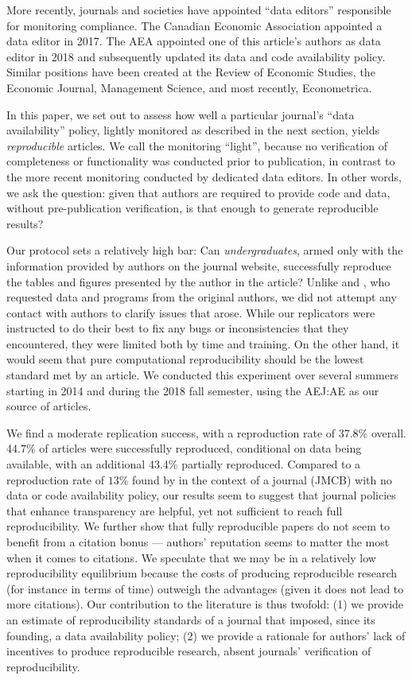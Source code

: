 \documentclass{cje} %
\theoremstyle{plain}%
\theoremstyle{definition}
\theoremstyle{remark}
\begin{document}
More recently, journals and societies have appointed ``data editors'' responsible for monitoring compliance. The Canadian Economic Association appointed a data editor  in 2017. The \ac{AEA} appointed one of this article's authors as data editor in 2018  \citep{10.1257/pandp.108.745} and subsequently updated its data and code availability policy. Similar positions have been created at the Review of Economic Studies, the Economic Journal, Management Science, and most recently, Econometrica. 

In this paper,  we set out to assess how well a particular journal's ``data availability'' policy, lightly monitored as described in the next section, yields \textit{reproducible} articles. We call the monitoring ``light'', because no verification of completeness or functionality was conducted prior to publication, in contrast to the more recent monitoring conducted by dedicated data editors. In other words, we ask the question: given that authors are required to provide code and data, without pre-publication verification, is that enough to generate reproducible results?

Our protocol sets a relatively high bar: Can \textit{undergraduates}, armed only with the information provided by authors on the journal website, successfully reproduce the tables and figures presented by the author in the article? Unlike \cite{Dewald1986} and \cite{McCullough03}, who requested data and programs from the original authors, we did not attempt any contact with authors to clarify issues that arose. While our replicators were instructed to do their best to fix any bugs or inconsistencies that they encountered, they were limited both by time and training. On the other hand, it would seem that pure computational reproducibility should be the lowest standard met by an article.
We conducted this experiment over several summers starting in 2014 and during the 2018 fall semester, using the \ac{AEJ:AE} as our source of articles.

We find a  moderate replication success, with a reproduction rate of 37.8$\%$ overall. 44.7$\%$ of articles were successfully reproduced, conditional on  data being available, with an additional 43.4$\%$ partially reproduced. Compared  to a reproduction rate of $13\%$ found by \cite{Dewald1986} in the context of a journal (\ac{JMCB}) with no data or code availability policy, our results seem to suggest that journal policies that enhance transparency are helpful, yet not sufficient to reach full reproducibility. We further show that fully reproducible papers do not seem to benefit from a citation bonus ---  authors' reputation seems to matter the most when it comes to citations. We speculate that we may be in a relatively low reproducibility equilibrium because the costs of producing reproducible research (for instance in terms of time) outweigh the advantages (given it does not lead to more citations). Our contribution to the literature is thus twofold: (1) we provide an estimate of reproducibility standards of a journal that imposed, since its founding, a data availability policy; (2) we provide a rationale for authors' lack of incentives to produce reproducible research, absent journals' verification of reproducibility.
\end{document}
